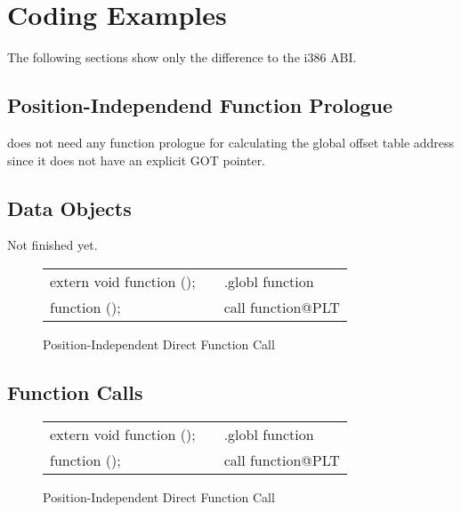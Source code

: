 \section{Coding Examples}

The following sections show only the difference to the i386 ABI.

\subsection{Position-Independend Function Prologue}

\xARCH does not need any function prologue for calculating the global
offset table address since it does not have an explicit GOT pointer.

\subsection{Data Objects}

Not finished yet.

\begin{figure}[H]
\Hrule
\caption{Position-Independent Direct Function Call}
\begin{center}
\begin{tabular}{|l|c|l|}
\cline{1-1}\cline{3-3}
extern void function ();  &&.globl function\\
function ();              &&call function@PLT\\
\cline{1-1}\cline{3-3}
\end{tabular}
\end{center}
\Hrule
\end{figure}

\subsection{Function Calls}

\begin{figure}[H]
\Hrule
\caption{Position-Independent Direct Function Call}
\begin{center}
\begin{tabular}{|l|c|l|}
\cline{1-1}\cline{3-3}
extern void function ();  &&.globl function\\
function ();              &&call function@PLT\\
\cline{1-1}\cline{3-3}
\end{tabular}
\end{center}
\Hrule
\end{figure}

